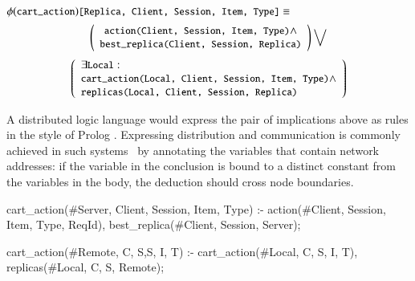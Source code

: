 \noindent{}$\phi(\dedalus{cart\_action})\dedalus{[Replica, Client, Session, Item, Type]} \equiv$
$$
\left(
\begin{array}{c}
\dedalus{action(Client, Session, Item, Type)} \land\\
\dedalus{best\_replica(Client, Session, Replica)}
\end{array}
\right) \bigvee
$$
$$
\left(
\begin{array}{l}
\exists \dedalus{Local}:\\
\dedalus{cart\_action(Local, Client, Session, Item, Type)} \land\\
\dedalus{replicas(Local, Client, Session, Replica)}
\end{array}
\right)
$$

A distributed logic language would express the pair of implications above as rules
in the style of Prolog .  Expressing distribution and communication
is commonly achieved in such systems~\cite{loo-sigmod06} by annotating the variables that 
contain network addresses: if the variable in the conclusion is bound to a distinct constant from the variables in
the body, the deduction should cross node boundaries.  

\begin{Dedalus}
cart\_action(#Server, Client, Session, Item, Type) :-
  action(#Client, Session, Item, Type, ReqId),
  best_replica(#Client, Session, Server);

cart\_action(#Remote, C, S,S, I, T) :-
  cart\_action(#Local, C, S, I, T),
  replicas(#Local, C, S, Remote);
\end{Dedalus}

